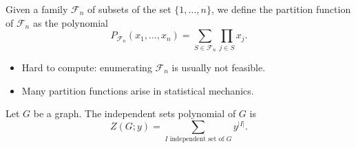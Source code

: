 \begin{frame}
  
  \begin{definition}
    Given a family $\mathcal{F}_n$ of subsets of the set $\{1, \ldots, n\}$, we define the partition
    function of $\mathcal{F}_n$ as the polynomial
    \begin{equation*}
      P_{\mathcal{F}_n}(x_1, \ldots, x_n) = \sum_{S \in \mathcal{F}_n} \prod_{j \in S} x_j.
    \end{equation*}
    \vspace*{-2mm}
  \end{definition}
  
  \begin{itemize}
  \item Hard to compute: enumerating $\mathcal{F}_n$ is usually not feasible.
    
  \item Many partition functions arise in statistical mechanics.
  \end{itemize}

  \begin{example}
    \vspace*{-1mm}
    Let $G$ be a graph. The independent sets polynomial of $G$ is
    \begin{equation*}
      Z(G; y) = \sum_{I \text{ independent set of } G} y^{|I|}.    
    \end{equation*}     
    \vspace*{-1mm}
  \end{example}
  
\end{frame}
